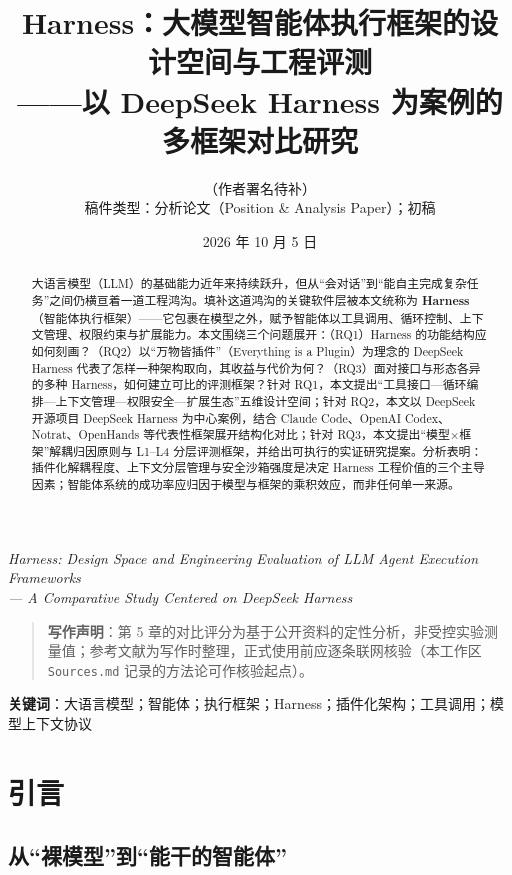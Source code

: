 \documentclass[11pt,a4paper]{ctexart}
\title{\bfseries Harness：大模型智能体执行框架的设计空间与工程评测\\[5pt]
       \large ——以 DeepSeek Harness 为案例的多框架对比研究}
\author{（作者署名待补）\\[3pt]
        \small 稿件类型：分析论文（Position \& Analysis Paper）；初稿}
\date{2026 年 10 月 5 日}
\begin{document}
\maketitle

\begin{center}
\small\itshape
Harness: Design Space and Engineering Evaluation of LLM Agent Execution Frameworks\\
--- A Comparative Study Centered on DeepSeek Harness
\end{center}

\begin{quote}
\small\textbf{写作声明}：第 5 章的对比评分为基于公开资料的定性分析，非受控实验测量值；参考文献为写作时整理，正式使用前应逐条联网核验（本工作区 \texttt{Sources.md} 记录的方法论可作核验起点）。
\end{quote}

\begin{abstract}
大语言模型（LLM）的基础能力近年来持续跃升，但从“会对话”到“能自主完成复杂任务”之间仍横亘着一道工程鸿沟。填补这道鸿沟的关键软件层被本文统称为 \textbf{Harness}（智能体执行框架）——它包裹在模型之外，赋予智能体以工具调用、循环控制、上下文管理、权限约束与扩展能力。本文围绕三个问题展开：（RQ1）Harness 的功能结构应如何刻画？（RQ2）以“万物皆插件”（Everything is a Plugin）为理念的 DeepSeek Harness 代表了怎样一种架构取向，其收益与代价为何？（RQ3）面对接口与形态各异的多种 Harness，如何建立可比的评测框架？针对 RQ1，本文提出“工具接口—循环编排—上下文管理—权限安全—扩展生态”五维设计空间；针对 RQ2，本文以 DeepSeek 开源项目 DeepSeek Harness 为中心案例，结合 Claude Code、OpenAI Codex、Notrat、OpenHands 等代表性框架展开结构化对比；针对 RQ3，本文提出“模型×框架”解耦归因原则与 L1--L4 分层评测框架，并给出可执行的实证研究提案。分析表明：插件化解耦程度、上下文分层管理与安全沙箱强度是决定 Harness 工程价值的三个主导因素；智能体系统的成功率应归因于模型与框架的乘积效应，而非任何单一来源。
\end{abstract}

\medskip
\noindent\textbf{关键词}：大语言模型；智能体；执行框架；Harness；插件化架构；工具调用；模型上下文协议

\section{引言}

\subsection{从“裸模型”到“能干的智能体”}
\end{document}
